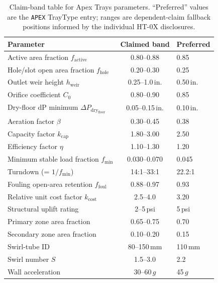 \documentclass[11pt,letterpaper]{article}
\newcommand{\dpd}{\Delta P_{\mathrm{dry}}}
\begin{document}
\begin{table}[H]
\centering
\caption{Claim-band table for Apex Trays parameters.  ``Preferred'' values are
the \texttt{APEX} TrayType entry; ranges are dependent-claim fallback positions
informed by the individual HT-0X disclosures.}
\label{tab:apex_claimband}
\small
\begin{tabular}{lcl}
\toprule
Parameter & Claimed band & Preferred\\
\midrule
Active area fraction $f_{\mathrm{active}}$           & 0.80--0.88      & 0.85\\
Hole/slot open area fraction $f_{\mathrm{hole}}$     & 0.20--0.30      & 0.25\\
Outlet weir height $h_{\mathrm{weir}}$               & 0.25--1.0\,in.  & 0.50\,in.\\
Orifice coefficient $C_0$                             & 0.80--0.90      & 0.85\\
Dry-floor dP minimum $\dpd_{\mathrm{floor}}$         & 0.05--0.15\,in. & 0.10\,in.\\
Aeration factor $\beta$                               & 0.30--0.45      & 0.38\\
Capacity factor $k_{\mathrm{cap}}$                   & 1.80--3.00      & 2.50\\
Efficiency factor $\eta$                              & 1.10--1.30      & 1.20\\
Minimum stable load fraction $f_{\mathrm{min}}$      & 0.030--0.070    & 0.045\\
Turndown (= $1/f_{\mathrm{min}}$)                    & 14:1--33:1      & 22.2:1\\
Fouling open-area retention $f_{\mathrm{foul}}$      & 0.88--0.97      & 0.93\\
Relative unit cost factor $k_{\mathrm{cost}}$        & 2.5--4.0        & 3.20\\
Structural uplift rating                              & 2--5\,psi       & 5\,psi\\
Primary zone area fraction                            & 0.65--0.75      & 0.70\\
Secondary zone area fraction                          & 0.10--0.20      & 0.15\\
Swirl-tube ID                                         & 80--150\,mm     & 110\,mm\\
Swirl number $S$                                      & 1.5--3.0        & 2.2\\
Wall acceleration                                     & 30--60\,$g$     & 45\,$g$\\

\end{tabular}
\end{table}
\end{document}
